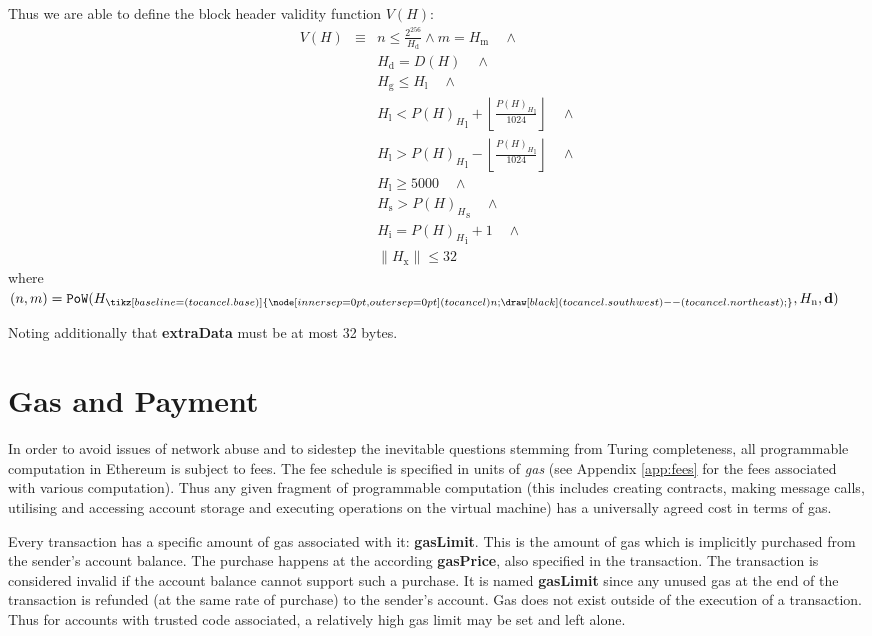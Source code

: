 \documentclass[9pt,oneside]{amsart}
\newcommand{\hcancel}[1]{%
    \tikz[baseline=(tocancel.base)]{
        \node[inner sep=0pt,outer sep=0pt] (tocancel) {#1};
        \draw[black] (tocancel.south west) -- (tocancel.north east);
    }%
}%
\begin{document}
\begin{multicols}{2}
\hypertarget{block_header_validity_function}{}Thus we are able to define the block header validity function $V(H)$:
\begin{eqnarray}
V(H) & \equiv &  n \leqslant \frac{2^{256}}{H_{\mathrm{d}}} \wedge m = H_{\mathrm{m}} \quad \wedge \\
& & H_{\mathrm{d}} = D(H) \quad \wedge \\
& & H_{\mathrm{g}} \le H_{\mathrm{l}}  \quad \wedge \\
& & H_{\mathrm{l}} < {P(H)_{H}}_{\mathrm{l}} + \left\lfloor\frac{{P(H)_{H}}_{\mathrm{l}}}{1024}\right\rfloor  \quad \wedge \\
& & H_{\mathrm{l}} > {P(H)_{H}}_{\mathrm{l}} - \left\lfloor\frac{{P(H)_{H}}_{\mathrm{l}}}{1024}\right\rfloor  \quad \wedge \\
& & H_{\mathrm{l}} \geqslant 5000  \quad \wedge \\
& & H_{\mathrm{s}} > {P(H)_{H}}_{\mathrm{s}} \quad \wedge \\
& & H_{\mathrm{i}} = {P(H)_{H}}_{\mathrm{i}} +1 \quad \wedge \\
& & \lVert H_{\mathrm{x}} \rVert \le 32
\end{eqnarray}
where $(n, m) = \mathtt{PoW}(H_{\hcancel{n}}, H_{\mathrm{n}}, \mathbf{d})$

Noting additionally that \textbf{extraData} must be at most 32 bytes.

\section{Gas and Payment} \label{ch:payment}

In order to avoid issues of network abuse and to sidestep the inevitable questions stemming from Turing completeness, all programmable computation in Ethereum is subject to fees. The fee schedule is specified in units of \textit{gas} (see Appendix \ref{app:fees} for the fees associated with various computation). Thus any given fragment of programmable computation (this includes creating contracts, making message calls, utilising and accessing account storage and executing operations on the virtual machine) has a universally agreed cost in terms of gas.

Every transaction has a specific amount of gas associated with it: \textbf{gasLimit}. This is the amount of gas which is implicitly purchased from the sender's account balance. The purchase happens at the according \textbf{gasPrice}, also specified in the transaction. The transaction is considered invalid if the account balance cannot support such a purchase. It is named \textbf{gasLimit} since any unused gas at the end of the transaction is refunded (at the same rate of purchase) to the sender's account. Gas does not exist outside of the execution of a transaction. Thus for accounts with trusted code associated, a relatively high gas limit may be set and left alone.


\end{multicols}
\end{document}
